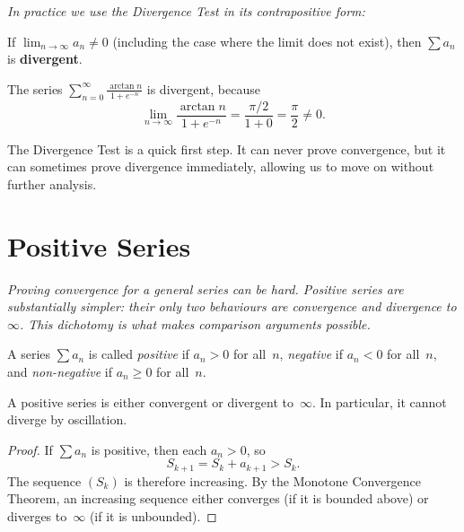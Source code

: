 \textit{In practice we use the Divergence Test in its contrapositive form:}

\begin{corollary}
\label{cor:13-1}
If $\lim_{n\to\infty}a_{n}\neq 0$ (including the case where the limit does not exist), then $\sum a_{n}$ is \textbf{divergent}.
\end{corollary}

\begin{example}
\label{ex:13-7}
The series $\displaystyle\sum_{n=0}^{\infty}\frac{\arctan n}{1+e^{-n}}$ is divergent, because
\[
  \lim_{n\to\infty}\frac{\arctan n}{1+e^{-n}} = \frac{\pi/2}{1+0} = \frac{\pi}{2}\neq 0.
\]
\end{example}

\begin{remark}
The Divergence Test is a quick first step.  It can never prove convergence, but it can sometimes prove divergence immediately, allowing us to move on without further analysis.
\end{remark}

\section{Positive Series}
\label{sec:13.9}

\textit{Proving convergence for a general series can be hard.  Positive series are substantially simpler: their only two behaviours are convergence and divergence to $\infty$.  This dichotomy is what makes comparison arguments possible.}

\begin{definition}
\label{def:13-3}
A series $\sum a_{n}$ is called \emph{positive} if $a_{n}>0$ for all~$n$, \emph{negative} if $a_{n}<0$ for all~$n$, and \emph{non-negative} if $a_{n}\ge 0$ for all~$n$.
\end{definition}

\begin{theorem}
\label{thm:13-6}
A positive series is either convergent or divergent to~$\infty$.  In particular, it cannot diverge by oscillation.
\end{theorem}

\begin{proof}
If $\sum a_{n}$ is positive, then each $a_{n}>0$, so
\[
  S_{k+1} = S_{k}+a_{k+1} > S_{k}.
\]
The sequence $(S_{k})$ is therefore increasing.  By the Monotone Convergence Theorem, an increasing sequence either converges (if it is bounded above) or diverges to~$\infty$ (if it is unbounded).
\end{proof}

